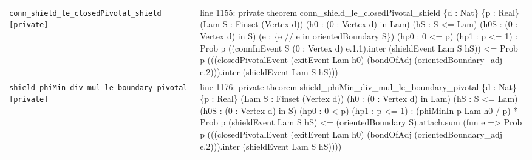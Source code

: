 \documentclass[10pt]{article}
\begin{document}
\begin{longtable}{>{\raggedright\arraybackslash}p{} >{\raggedright\arraybackslash}p{}}
\texttt{conn\_\allowbreak{}shield\_\allowbreak{}le\_\allowbreak{}closedPivotal\_\allowbreak{}shield [private]} & {\ttfamily\scriptsize line 1155:\allowbreak{} private theorem conn\_\allowbreak{}shield\_\allowbreak{}le\_\allowbreak{}closedPivotal\_\allowbreak{}shield \{d :\allowbreak{} Nat\} \{p :\allowbreak{} Real\} (\allowbreak{}Lam S :\allowbreak{} Finset (\allowbreak{}Vertex d)\allowbreak{})\allowbreak{} (\allowbreak{}h0 :\allowbreak{} (\allowbreak{}0 :\allowbreak{} Vertex d)\allowbreak{} in Lam)\allowbreak{} (\allowbreak{}hS :\allowbreak{} S <=\allowbreak{} Lam)\allowbreak{} (\allowbreak{}h0S :\allowbreak{} (\allowbreak{}0 :\allowbreak{} Vertex d)\allowbreak{} in S)\allowbreak{} (\allowbreak{}e :\allowbreak{} \{e /\allowbreak{}/\allowbreak{} e in orientedBoundary S\})\allowbreak{} (\allowbreak{}hp0 :\allowbreak{} 0 <=\allowbreak{} p)\allowbreak{} (\allowbreak{}hp1 :\allowbreak{} p <=\allowbreak{} 1)\allowbreak{} :\allowbreak{} Prob p (\allowbreak{}(\allowbreak{}connInEvent S (\allowbreak{}0 :\allowbreak{} Vertex d)\allowbreak{} e.\allowbreak{}1.\allowbreak{}1)\allowbreak{}.\allowbreak{}inter (\allowbreak{}shieldEvent Lam S hS)\allowbreak{})\allowbreak{} <=\allowbreak{} Prob p (\allowbreak{}(\allowbreak{}(\allowbreak{}closedPivotalEvent (\allowbreak{}exitEvent Lam h0)\allowbreak{} (\allowbreak{}bondOfAdj (\allowbreak{}orientedBoundary\_\allowbreak{}adj e.\allowbreak{}2)\allowbreak{})\allowbreak{})\allowbreak{}.\allowbreak{}inter (\allowbreak{}shieldEvent Lam S hS)\allowbreak{})\allowbreak{})\allowbreak{}} \\[0.45em]
\texttt{shield\_\allowbreak{}phiMin\_\allowbreak{}div\_\allowbreak{}mul\_\allowbreak{}le\_\allowbreak{}boundary\_\allowbreak{}pivotal [private]} & {\ttfamily\scriptsize line 1176:\allowbreak{} private theorem shield\_\allowbreak{}phiMin\_\allowbreak{}div\_\allowbreak{}mul\_\allowbreak{}le\_\allowbreak{}boundary\_\allowbreak{}pivotal \{d :\allowbreak{} Nat\} \{p :\allowbreak{} Real\} (\allowbreak{}Lam S :\allowbreak{} Finset (\allowbreak{}Vertex d)\allowbreak{})\allowbreak{} (\allowbreak{}h0 :\allowbreak{} (\allowbreak{}0 :\allowbreak{} Vertex d)\allowbreak{} in Lam)\allowbreak{} (\allowbreak{}hS :\allowbreak{} S <=\allowbreak{} Lam)\allowbreak{} (\allowbreak{}h0S :\allowbreak{} (\allowbreak{}0 :\allowbreak{} Vertex d)\allowbreak{} in S)\allowbreak{} (\allowbreak{}hp0 :\allowbreak{} 0 < p)\allowbreak{} (\allowbreak{}hp1 :\allowbreak{} p <=\allowbreak{} 1)\allowbreak{} :\allowbreak{} (\allowbreak{}phiMinIn p Lam h0 /\allowbreak{} p)\allowbreak{} *\allowbreak{} Prob p (\allowbreak{}shieldEvent Lam S hS)\allowbreak{} <=\allowbreak{} (\allowbreak{}orientedBoundary S)\allowbreak{}.\allowbreak{}attach.\allowbreak{}sum (\allowbreak{}fun e =\allowbreak{}> Prob p (\allowbreak{}(\allowbreak{}(\allowbreak{}closedPivotalEvent (\allowbreak{}exitEvent Lam h0)\allowbreak{} (\allowbreak{}bondOfAdj (\allowbreak{}orientedBoundary\_\allowbreak{}adj e.\allowbreak{}2)\allowbreak{})\allowbreak{})\allowbreak{}.\allowbreak{}inter (\allowbreak{}shieldEvent Lam S hS)\allowbreak{})\allowbreak{})\allowbreak{})\allowbreak{}} \\[0.45em]

\end{longtable}
\end{document}
